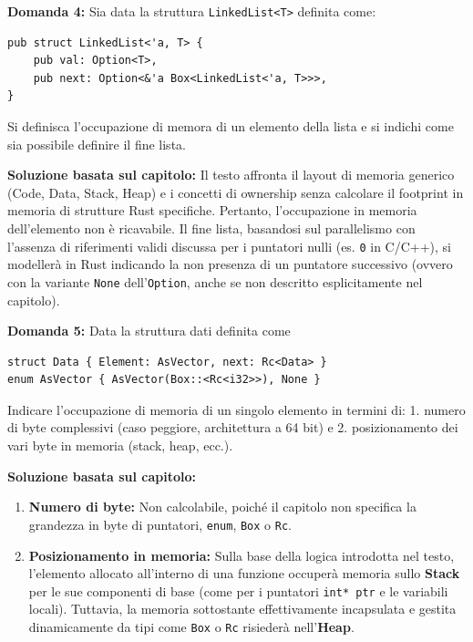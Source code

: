 \begin{exambox}
\textbf{Domanda 4:} Sia data la struttura \texttt{LinkedList<T>} definita come:
\begin{verbatim}
pub struct LinkedList<'a, T> { 
    pub val: Option<T>, 
    pub next: Option<&'a Box<LinkedList<'a, T>>>, 
}
\end{verbatim}
Si definisca l’occupazione di memora di un elemento della lista e si indichi come sia possibile definire il fine lista.
\end{exambox}
\textbf{Soluzione basata sul capitolo:}
Il testo affronta il layout di memoria generico (Code, Data, Stack, Heap) e i concetti di ownership senza calcolare il footprint in memoria di strutture Rust specifiche. Pertanto, l'occupazione in memoria dell'elemento non è ricavabile. Il fine lista, basandosi sul parallelismo con l'assenza di riferimenti validi discussa per i puntatori nulli (es. \texttt{0} in C/C++), si modellerà in Rust indicando la non presenza di un puntatore successivo (ovvero con la variante \texttt{None} dell'\texttt{Option}, anche se non descritto esplicitamente nel capitolo).

\begin{exambox}
\textbf{Domanda 5:} Data la struttura dati definita come
\begin{verbatim}
struct Data { Element: AsVector, next: Rc<Data> }
enum AsVector { AsVector(Box::<Rc<i32>>), None }
\end{verbatim}
Indicare l’occupazione di memoria di un singolo elemento in termini di: 1. numero di byte complessivi (caso peggiore, architettura a 64 bit) e 2. posizionamento dei vari byte in memoria (stack, heap, ecc.).
\end{exambox}
\textbf{Soluzione basata sul capitolo:}
\begin{enumerate}
    \item \textbf{Numero di byte:} Non calcolabile, poiché il capitolo non specifica la grandezza in byte di puntatori, \texttt{enum}, \texttt{Box} o \texttt{Rc}.
    \item \textbf{Posizionamento in memoria:} Sulla base della logica introdotta nel testo, l'elemento allocato all'interno di una funzione occuperà memoria sullo \textbf{Stack} per le sue componenti di base (come per i puntatori \texttt{int* ptr} e le variabili locali). Tuttavia, la memoria sottostante effettivamente incapsulata e gestita dinamicamente da tipi come \texttt{Box} o \texttt{Rc} risiederà nell'\textbf{Heap}.
\end{enumerate}
